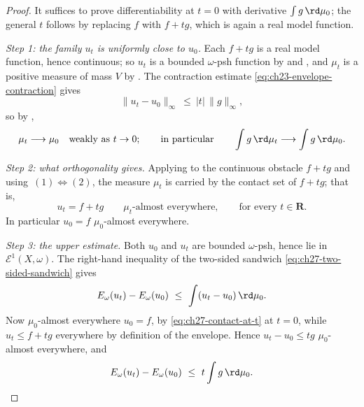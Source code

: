 \begin{proof}
It suffices to prove differentiability at \(t=0\) with derivative
\(\int g\,\rd\mu_0\); the general \(t\) follows by replacing \(f\) with
\(f+tg\), which is again a real model function.

\emph{Step 1: the family \(u_t\) is uniformly close to \(u_0\).}
Each \(f+tg\) is a real model function, hence continuous; so
\(u_t\) is a bounded \(\omega\)-psh function by
 and
, and \(\mu_t\) is a positive measure of
mass \(V\) by .  The contraction estimate
\eqref{eq:ch23-envelope-contraction} gives
\begin{equation}\label{eq:ch27-envelope-lipschitz-in-t}
 \lVert u_t-u_0\rVert_\infty\ \leq\ |t|\,\lVert g\rVert_\infty ,
\end{equation}
so by ,
\begin{equation}\label{eq:ch27-measures-converge}
 \mu_t\longrightarrow\mu_0
 \quad\text{weakly as }t\to0;
 \qquad\text{in particular}\qquad
 \int g\,\rd\mu_t\longrightarrow\int g\,\rd\mu_0 .
\end{equation}

\emph{Step 2: what orthogonality gives.}
Applying  to the continuous obstacle
\(f+tg\) and using
\,\((1)\Leftrightarrow(2)\), the
measure \(\mu_t\) is carried by the contact set of \(f+tg\); that is,
\begin{equation}\label{eq:ch27-contact-at-t}
 u_t=f+tg
 \qquad\mu_t\text{-almost everywhere},
 \qquad\text{for every }t\in\mathbf R .
\end{equation}
In particular \(u_0=f\) \(\mu_0\)-almost everywhere.

\emph{Step 3: the upper estimate.}
Both \(u_0\) and \(u_t\) are bounded \(\omega\)-psh, hence lie in
\(\mathcal E^1(X,\omega)\).  The right-hand inequality of the two-sided
sandwich \eqref{eq:ch27-two-sided-sandwich} gives
\[
 E_\omega(u_t)-E_\omega(u_0)\ \leq\ \int(u_t-u_0)\,\rd\mu_0 .
\]
Now \(\mu_0\)-almost everywhere \(u_0=f\), by \eqref{eq:ch27-contact-at-t}
at \(t=0\), while \(u_t\leq f+tg\) everywhere by definition of the envelope.
Hence \(u_t-u_0\leq tg\) \(\mu_0\)-almost everywhere, and
\begin{equation}\label{eq:ch27-upper-estimate}
 E_\omega(u_t)-E_\omega(u_0)\ \leq\ t\int g\,\rd\mu_0 .
\end{equation}


\end{proof}

